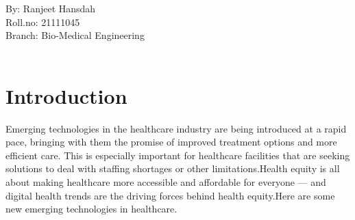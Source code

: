 \documentclass{article}[A4,12pt]
\begin{document}

\section*{}

\large By: Ranjeet Hansdah\\

\large Roll.no: 21111045\\

\large Branch: Bio-Medical Engineering\\~\\
\newpage


\section*{Introduction}
Emerging technologies in the healthcare industry are being introduced at a rapid pace, bringing with them the promise of improved treatment options and more efficient care. This is especially important for healthcare facilities that are seeking solutions to deal with staffing shortages or other limitations.Health equity is all about making healthcare more accessible and affordable for everyone — and digital health trends are the driving forces behind health equity.Here are some new emerging technologies in healthcare. 
\end{document}
